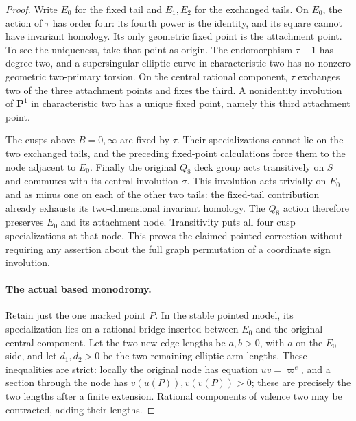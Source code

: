 \begin{proof}
Write \(E_0\) for the fixed tail and \(E_1,E_2\) for the
exchanged tails. On \(E_0\), the action of \(\tau\) has order
four: its fourth power is the identity, and its square cannot
have invariant homology. Its only geometric fixed point is
the attachment point. To see the uniqueness, take that point
as origin. The endomorphism \(\tau-1\) has degree two, and a
supersingular elliptic curve in characteristic two has no
nonzero geometric two-primary torsion. On the central
rational component, \(\tau\) exchanges two of the three
attachment points and fixes the third. A nonidentity
involution of \(\mathbf P^1\) in characteristic two has a
unique fixed point, namely this third attachment point.

The cusps above \(B=0,\infty\) are fixed by \(\tau\). Their
specializations cannot lie on the two exchanged tails, and
the preceding fixed-point calculations force them to the
node adjacent to \(E_0\). Finally the original \(Q_8\) deck
group acts transitively on \(S\) and commutes with its central
involution \(\sigma\). This involution acts trivially on
\(E_0\) and as minus one on each of the other two tails:
the fixed-tail contribution already exhausts its
two-dimensional invariant homology. The \(Q_8\) action
therefore preserves \(E_0\) and its attachment node.
Transitivity puts all four cusp specializations at that node.
This proves the claimed pointed correction without requiring
any assertion about the full graph permutation of a coordinate
sign involution.

\paragraph{The actual based monodromy.}
Retain just the one marked point \(P\). In the stable pointed
model, its specialization lies on a rational bridge inserted
between \(E_0\) and the original central component. Let the
two new edge lengths be \(a,b>0\), with \(a\) on the \(E_0\)
side, and let \(d_1,d_2>0\) be the two remaining elliptic-arm
lengths. These inequalities are strict: locally the original
node has equation \(uv=\varpi^e\), and a section through
the node has \(v(u(P)),v(v(P))>0\); these are precisely the
two lengths after a finite extension. Rational components
of valence two may be contracted, adding their lengths.


\end{proof}
